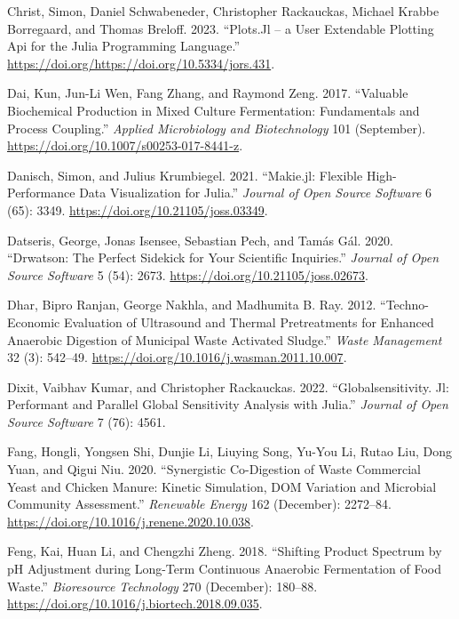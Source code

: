 \documentclass[11pt]{report}
\begin{document}
\begin{hangparas}{1.5em}{1}
\hypertarget{citeproc_bib_item_16}{Christ, Simon, Daniel Schwabeneder, Christopher Rackauckas, Michael Krabbe Borregaard, and Thomas Breloff. 2023. “Plots.Jl – a User Extendable Plotting Api for the Julia Programming Language.” \url{https://doi.org/https://doi.org/10.5334/jors.431}.}

\hypertarget{citeproc_bib_item_17}{Dai, Kun, Jun-Li Wen, Fang Zhang, and Raymond Zeng. 2017. “Valuable Biochemical Production in Mixed Culture Fermentation: Fundamentals and Process Coupling.” \textit{Applied Microbiology and Biotechnology} 101 (September). \url{https://doi.org/10.1007/s00253-017-8441-z}.}

\hypertarget{citeproc_bib_item_18}{Danisch, Simon, and Julius Krumbiegel. 2021. “Makie.jl: Flexible High-Performance Data Visualization for Julia.” \textit{Journal of Open Source Software} 6 (65): 3349. \url{https://doi.org/10.21105/joss.03349}.}

\hypertarget{citeproc_bib_item_19}{Datseris, George, Jonas Isensee, Sebastian Pech, and Tamás Gál. 2020. “Drwatson: The Perfect Sidekick for Your Scientific Inquiries.” \textit{Journal of Open Source Software} 5 (54): 2673. \url{https://doi.org/10.21105/joss.02673}.}

\hypertarget{citeproc_bib_item_20}{Dhar, Bipro Ranjan, George Nakhla, and Madhumita B. Ray. 2012. “Techno-Economic Evaluation of Ultrasound and Thermal Pretreatments for Enhanced Anaerobic Digestion of Municipal Waste Activated Sludge.” \textit{Waste Management} 32 (3): 542–49. \url{https://doi.org/10.1016/j.wasman.2011.10.007}.}

\hypertarget{citeproc_bib_item_21}{Dixit, Vaibhav Kumar, and Christopher Rackauckas. 2022. “Globalsensitivity. Jl: Performant and Parallel Global Sensitivity Analysis with Julia.” \textit{Journal of Open Source Software} 7 (76): 4561.}

\hypertarget{citeproc_bib_item_22}{Fang, Hongli, Yongsen Shi, Dunjie Li, Liuying Song, Yu-You Li, Rutao Liu, Dong Yuan, and Qigui Niu. 2020. “Synergistic Co-Digestion of Waste Commercial Yeast and Chicken Manure: Kinetic Simulation, DOM Variation and Microbial Community Assessment.” \textit{Renewable Energy} 162 (December): 2272–84. \url{https://doi.org/10.1016/j.renene.2020.10.038}.}

\hypertarget{citeproc_bib_item_23}{Feng, Kai, Huan Li, and Chengzhi Zheng. 2018. “Shifting Product Spectrum by pH Adjustment during Long-Term Continuous Anaerobic Fermentation of Food Waste.” \textit{Bioresource Technology} 270 (December): 180–88. \url{https://doi.org/10.1016/j.biortech.2018.09.035}.}


\end{hangparas}
\end{document}
